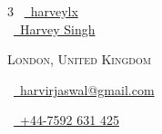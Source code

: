 \documentclass[a4paper,10pt]{extarticle} %
\begin{document}
\pagestyle{empty} %


\begin{multicols}{3}
\normalsize \faGithub\ {\href{https://github.com/harveylx}{\ harveylx}}\\
\normalsize \faLinkedinSquare\ {\href{https://www.linkedin.com/in/harveysingh1}{\  Harvey Singh}}\\

\columnbreak

\par{\par} %
\par{\centering\normalsize {\textsc{London, United Kingdom}}\hfill\par}
\columnbreak
\raggedright\hfill\normalsize \faEnvelope\ {\href{mailto:harvirjaswal@gmail.com}{\  harvirjaswal@gmail.com}}\\
\raggedright\hfill\normalsize \faPhone\ {\href{tel:07592631425|}{\  +44-7592 631 425}}\\
\end{multicols}

\end{document}
